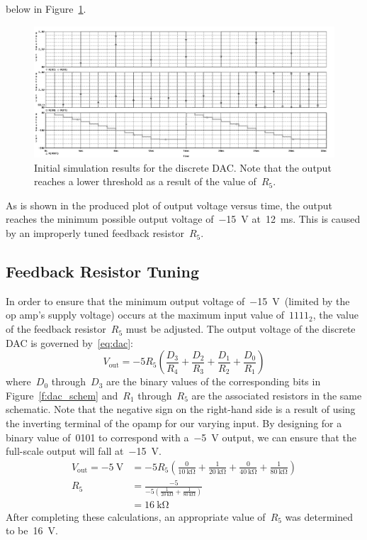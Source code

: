 below in Figure~\ref{f:dac_plot1}.
%
\begin{figure}[H]
\centering
	\includegraphics[width=.8\textwidth]{img/plot/part1_plot1b.PNG}
	\parbox{.8\textwidth}{
	\caption[Discrete DAC --- Initial Results]{Initial simulation results for
	the discrete DAC.  Note that the output reaches a lower threshold as a
	result of the value of~$R_5$.}
	\label{f:dac_plot1}}
\end{figure}
%
As is shown in the produced plot of output voltage versus time, the output
reaches the minimum possible output voltage of~\SI{-15}{\volt}
at~\SI{12}{\milli\second}.  This is caused by an improperly tuned feedback
resistor~$R_5$.

\subsection{Feedback Resistor Tuning}
In order to ensure that the minimum output voltage of~\SI{-15}{\volt}~(limited
by the op amp's supply voltage) occurs at the maximum input value of~$1111_2$,
the value of the feedback resistor~$R_5$ must be adjusted.  The output voltage
of the discrete DAC is governed by~\eqref{eq:dac}:
%
\begin{equation}
	V_\text{out} = - 5 R_5 \left( \frac{D_3}{R_4} + \frac{D_2}{R_3} + \frac{D_1}{R_2} + \frac{D_0}{R_1} \right)
	\label{eq:dac}
\end{equation}
%
where~$D_0$ through~$D_3$ are the binary values of the corresponding bits in
Figure~\ref{f:dac_schem} and~$R_1$ through~$R_5$ are the associated resistors
in the same schematic.  Note that the negative sign on the right-hand side is a
result of using the inverting terminal of the opamp for our varying input.  By
designing for a binary value of~0101 to correspond with a~\SI{-5}{\volt}
output, we can ensure that the full-scale output will fall at~\SI{-15}{\volt}.
%
\begin{align*}
	V_\text{out} = \SI{-5}{\volt} &= -5 R_5 \left( \frac{0}{\SI{10}{\kilo\ohm}} + \frac{1}{\SI{20}{\kilo\ohm}} + \frac{0}{\SI{40}{\kilo\ohm}} + \frac{1}{\SI{80}{\kilo\ohm}} \right) \\
	R_5 &= \frac{ -5 } { -5 \left( \frac{1}{\SI{20}{\kilo\ohm}} + \frac{1}{\SI{80}{\kilo\ohm}} \right) } \\
	    &= \SI{16}{\kilo\ohm}
\end{align*}
%
After completing these calculations, an appropriate value of~$R_5$ was
determined to be~\SI{16}{\volt}.


